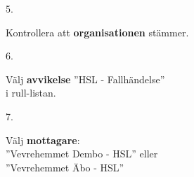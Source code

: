 \documentclass[paper=a5,DIV=15,headinclude,twoside=semi,openany,titlepage=firstiscover]{scrbook}
\begin{document}
\noindent\hrulefill

\vfill
\noindent
\begin{minipage}[t]{0.06\textwidth}
	\phantom{1}5.
\end{minipage}%
\begin{minipage}[t]{.44\textwidth}\raggedright
	Kontrollera att \textbf{organisationen} stämmer.
\end{minipage}%
\begin{minipage}[t]{.5\textwidth}
	\hfill{}
\end{minipage}
\vfill

\noindent\hrulefill

\vfill
\noindent
\begin{minipage}[t]{0.06\textwidth}
	\phantom{1}6.
\end{minipage}%
\begin{minipage}[t]{.54\textwidth}\raggedright
	Välj \textbf{avvikelse} ”HSL - Fallhändelse”\\
	i rull-listan.
\end{minipage}%
\begin{minipage}[t]{.4\textwidth}
	\hfill{}
\end{minipage}
\vfill

\noindent\hrulefill

\vfill
\noindent
\begin{minipage}[t]{0.06\textwidth}
	\phantom{1}7.
\end{minipage}%
\begin{minipage}[t]{.54\textwidth}\raggedright
	Välj \textbf{mottagare}:\\ 
	”Vevrehemmet Dembo - HSL” eller\\”Vevrehemmet Äbo - HSL”
\end{minipage}%
\begin{minipage}[t]{.4\textwidth}
	\hfill{}
\end{minipage}
\vfill
\end{document}
